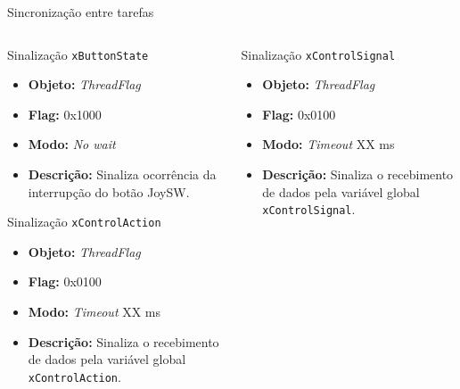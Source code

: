 \documentclass{if-beamer}
\begin{document}
\begin{frame}{Sincronização entre tarefas}
	
	\begin{columns}
		
		\begin{column}{0.5\textwidth}
			
				\begin{block}{Sinalização \texttt{xButtonState}}
				
				\begin{itemize}
					\item \textbf{Objeto:} \textit{ThreadFlag}
					\item \textbf{Flag:} 0x1000
					\item \textbf{Modo:} \textit{No wait}
					\item \textbf{Descrição:} Sinaliza ocorrência da interrupção do botão JoySW.
					
				\end{itemize}
				
			\end{block}
	

			\begin{block}{Sinalização \texttt{xControlAction}}
			
			\begin{itemize}
				\item \textbf{Objeto:} \textit{ThreadFlag}
				\item \textbf{Flag:} 0x0100
				\item \textbf{Modo:} \textit{Timeout} XX ms
				\item \textbf{Descrição:} Sinaliza o recebimento de dados pela variável global \texttt{xControlAction}.
				
			\end{itemize}	
			
			\end{block}
			
		\end{column}
		
		\begin{column}{0.5\textwidth}
			
			\begin{block}{Sinalização \texttt{xControlSignal}}
				
				\begin{itemize}
					\item \textbf{Objeto:} \textit{ThreadFlag}
					\item \textbf{Flag:} 0x0100
					\item \textbf{Modo:} \textit{Timeout} XX ms
					\item \textbf{Descrição:} Sinaliza o recebimento de dados pela variável global \texttt{xControlSignal}.
					
				\end{itemize}	
				
			\end{block}
			
		\end{column}
		
	\end{columns}
	
\end{frame}
\end{document}
